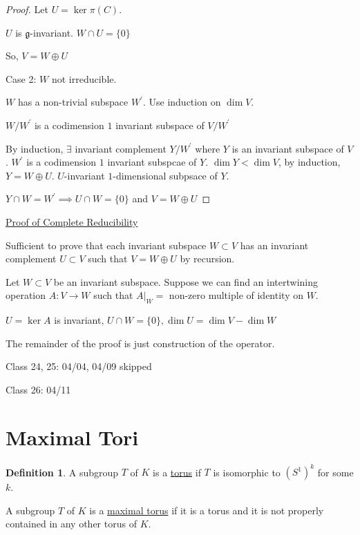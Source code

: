 \documentclass{article}
\theoremstyle{definition}
\newtheorem{definition}{Definition}
\begin{document}
\begin{proof}
    Let \(U = \ker \pi(C)\).

    \(U\) is \(\mathfrak{g}\)-invariant. \(W\cap U = \{ 0 \} \)  

    So, \(V = W \oplus U\)
    
    Case 2: \(W\) not irreducible.

    \(W\) has a non-trivial subspace \(W^{\prime}  \). Use induction on \(\dim V\).
    
    \(W / W^{\prime}\) is a codimension \(1\) invariant subspace of \(V / W^{\prime} \)
    
    By induction, \(\exists\) invariant complement \(Y / W^{\prime} \) where \(Y\) is an invariant subspace of \(V\). \(W^{\prime}\) is a codimension \(1\) invariant subspcae of \(Y\). \(\dim Y < \dim V\), by induction, \(Y = W \oplus U\). \(U\)-invariant \(1\)-dimensional subpsace of \(Y\).
    
    \(Y\cap W = W^{\prime} \implies U \cap W = \{ 0 \} \) and \(V = W \oplus U\)  

\end{proof}

\underline{Proof of Complete Reducibility} 

Sufficient to prove that each invariant subspace \(W \subset V\) has an invariant complement \(U \subset V\) such that \(V = W \oplus U\) by recursion.

Let \(W \subset V\) be an invariant subspace. Suppose we can find an intertwining operation \(A: V \to W\) such that \(A|_W =\) non-zero multiple of identity on \(W\).

\(U = \ker A\) is invariant, \(U \cap W = \{ 0 \}, \dim U = \dim V - \dim W\)  

The remainder of the proof is just construction of the operator.

\hrulefill

Class 24, 25: 04/04, 04/09 skipped

\hrulefill

Class 26: 04/11

\section*{Maximal Tori}

\begin{definition}
    A subgroup \(T\) of \(K\) is a \underline{torus} if \(T\) is isomorphic to \((S^1)^k\) for some \(k\).

    A subgroup \(T\) of \(K\) is a \underline{maximal torus} if it is a torus and it is not properly contained in any other torus of \(K\).
\end{definition}
\end{document}
